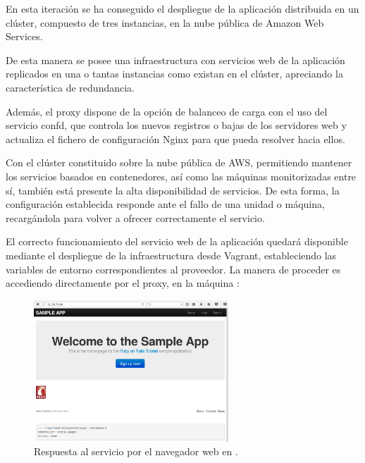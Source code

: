En esta iteración se ha conseguido el despliegue de la aplicación distribuida en un clúster, compuesto de tres instancias, en la nube pública de Amazon Web Services.

De esta manera se posee una infraestructura con servicios web de la aplicación replicados en una o tantas instancias como existan en el clúster, apreciando la característica de redundancia. 

Además, el proxy dispone de la opción de balanceo de carga con el uso del servicio confd, que controla los nuevos registros o bajas de los servidores web y actualiza el fichero de configuración Nginx para que pueda resolver hacia ellos. 

Con el clúster constituido sobre la nube pública de AWS, permitiendo mantener los servicios basados en contenedores, así como las máquinas monitorizadas entre sí, también está presente la alta disponibilidad de servicios. De esta forma, la configuración establecida responde ante el fallo de una unidad o máquina, recargándola para volver a ofrecer correctamente el servicio.

El correcto funcionamiento del servicio web de la aplicación quedará disponible mediante el despliegue de la infraestructura desde Vagrant, estableciendo las variables de entorno correspondientes al proveedor. La manera de proceder es accediendo directamente por el proxy, en la máquina :


\begin{figure}[H]
\centering
\includegraphics[width=0.65\textwidth]{images/figures/web-confd.png}
\caption{Respuesta al servicio por el navegador web en .}
\end{figure}

